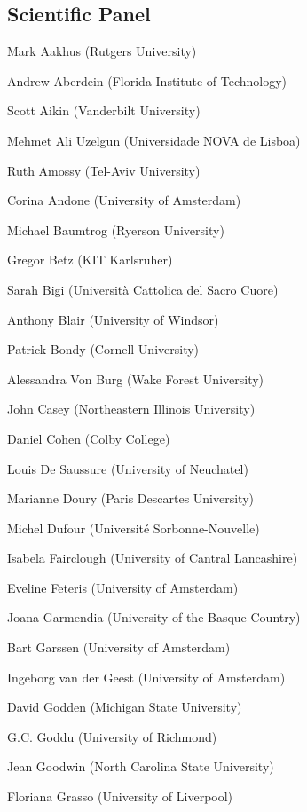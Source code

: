 	\subsection*{Scientific Panel}
	\begin{compactitem}[]
		\item[] Mark Aakhus (Rutgers University)
		\item[] Andrew Aberdein (Florida Institute of Technology)
		\item[] Scott Aikin (Vanderbilt University)
		\item[] Mehmet Ali Uzelgun (Universidade NOVA de Lisboa)
		\item[] Ruth Amossy (Tel-Aviv University)
		\item[] Corina Andone (University of Amsterdam)
		\item[] Michael Baumtrog (Ryerson University)
		\item[] Gregor Betz (KIT Karlsruher)
		\item[] Sarah Bigi (Università Cattolica del Sacro Cuore)
		\item[] Anthony Blair (University of Windsor)
		\item[] Patrick Bondy (Cornell University)
		\item[] Alessandra Von Burg (Wake Forest University)
		\item[] John Casey (Northeastern Illinois University)
		\item[] Daniel Cohen (Colby College)
		\item[] Louis De Saussure (University of Neuchatel)
		\item[] Marianne Doury (Paris Descartes University)
		\item[] Michel Dufour (Université Sorbonne-Nouvelle)
		\item[] Isabela Fairclough (University of Cantral Lancashire)
		\item[] Eveline Feteris (University of Amsterdam)
		\item[] Joana Garmendia (University of the Basque Country)
		\item[] Bart Garssen (University of Amsterdam)
		\item[] Ingeborg van der Geest (University of Amsterdam)
		\item[] David Godden (Michigan State University)
		\item[] G.C. Goddu (University of Richmond)
		\item[] Jean Goodwin (North Carolina State University)
		\item[] Floriana Grasso (University of Liverpool)

\end{compactitem}

